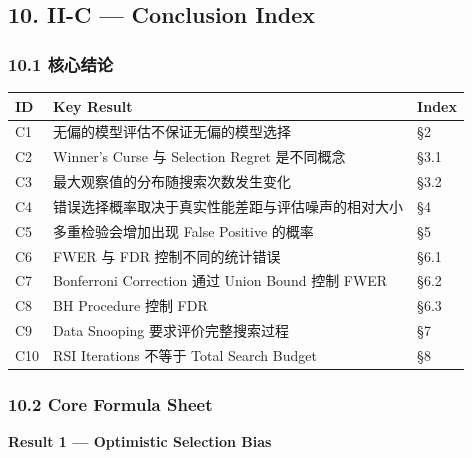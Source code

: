 \hypertarget{part-2-16-0001-ii-c-conclusion-index}{%
\subsection{10. II-C --- Conclusion Index}\label{part-2-16-0001-ii-c-conclusion-index}}

\hypertarget{part-2-16-0001-ux6838ux5fc3ux7ed3ux8bba}{%
\subsubsection{10.1 核心结论}\label{part-2-16-0001-ux6838ux5fc3ux7ed3ux8bba}}

\begin{readertable}
\begin{longtable}[]{@{}
  >{\raggedright\arraybackslash}p{}
  >{\raggedright\arraybackslash}p{}
  >{\raggedright\arraybackslash}p{}@{}}
\toprule
ID & Key Result & Index \\
\midrule
\endhead
C1 & 无偏的模型评估不保证无偏的模型选择 & §2 \\
C2 & Winner's Curse 与 Selection Regret 是不同概念 & §3.1 \\
C3 & 最大观察值的分布随搜索次数发生变化 & §3.2 \\
C4 & 错误选择概率取决于真实性能差距与评估噪声的相对大小 & §4 \\
C5 & 多重检验会增加出现 False Positive 的概率 & §5 \\
C6 & FWER 与 FDR 控制不同的统计错误 & §6.1 \\
C7 & Bonferroni Correction 通过 Union Bound 控制 FWER & §6.2 \\
C8 & BH Procedure 控制 FDR & §6.3 \\
C9 & Data Snooping 要求评价完整搜索过程 & §7 \\
C10 & RSI Iterations 不等于 Total Search Budget & §8 \\
\bottomrule
\end{longtable}
\end{readertable}

\hypertarget{part-2-16-0001-core-formula-sheet}{%
\subsubsection{10.2 Core Formula Sheet}\label{part-2-16-0001-core-formula-sheet}}

\textbf{Result 1 --- Optimistic Selection Bias}

